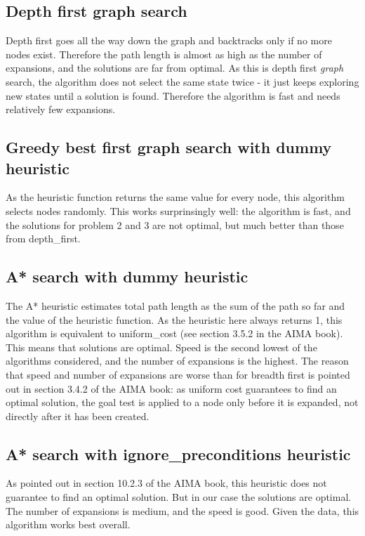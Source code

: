 \documentclass[11pt]{scrartcl}
\begin{document}
\subsection*{Depth first graph search}\label{depth-first-graph-search}
Depth first goes all the way down the graph and backtracks only if no more nodes exist. Therefore the path length is almost as high as the number of expansions, and the solutions are far from optimal. As this is depth first \emph{graph} search, the algorithm does not select the same state twice - it just keeps exploring new states until a solution is found. Therefore the algorithm is fast and needs relatively few expansions.

\subsection*{Greedy best first graph search with dummy
heuristic}\label{greedy-best-first-graph-search-with-dummy-heuristic}
As the heuristic function returns the same value for every node, this
algorithm selects nodes randomly. This works surprinsingly well: the
algorithm is fast, and the solutions for problem 2 and 3 are not
optimal, but much better than those from depth\_first.

\subsection*{A* search with dummy
heuristic}\label{a-search-with-dummy-heuristic}
The A* heuristic estimates total path length as the sum of the path so far and the value of the heuristic function. As the heuristic here always returns 1, this algorithm is equivalent to uniform\_cost (see section 3.5.2 in the AIMA book). This means that solutions are optimal. Speed is the second lowest of the algorithms considered, and the number of expansions is the highest. The reason that speed and number of expansions are worse than for breadth first is pointed out in section 3.4.2 of the AIMA book: as uniform cost guarantees to find an optimal solution, the goal test is applied to a node only before it is expanded, not directly after it has been created.

\subsection*{A* search with ignore\_preconditions
heuristic}\label{a-search-with-ignore_preconditions-heuristic}
As pointed out in section 10.2.3 of the AIMA book, this heuristic does not guarantee to find an optimal solution. But in our case the solutions are optimal. The number of expansions is medium, and the speed is good. Given the data, this algorithm works best overall.
\end{document}
